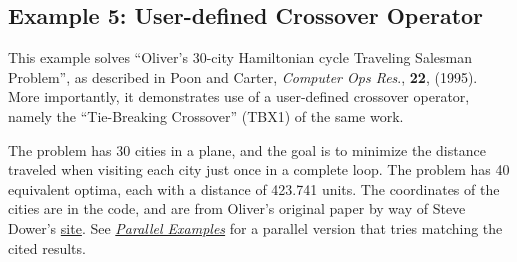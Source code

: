 \documentclass[letterpaper,11pt,english]{sphinxmanual}
\begin{document}
\subsection{Example 5: User-defined Crossover Operator}
\label{examples:sec-crossoverexamples}\label{examples:example-5-user-defined-crossover-operator}
This example solves ``Oliver's 30-city Hamiltonian cycle Traveling
Salesman Problem'', as described in Poon and Carter, \emph{Computer Ops
Res}., \textbf{22}, (1995).  More importantly, it demonstrates use of a
user-defined crossover operator, namely the ``Tie-Breaking
Crossover'' (TBX1) of the same work.

The problem has 30 cities in a plane, and the goal is to minimize
the distance traveled when visiting each city just once in a complete
loop.
The problem has 40 equivalent optima, each with a distance of
423.741 units.  The coordinates of the cities are in the code, and
are from Oliver's original paper by way of Steve Dower's
\href{http://www.stevedower.id.au/other/oliver30}{site}.  See
{\hyperref[examples:sec-parallelexamples]{\emph{Parallel Examples}}} for a parallel version that tries
matching the cited results.
\end{document}
